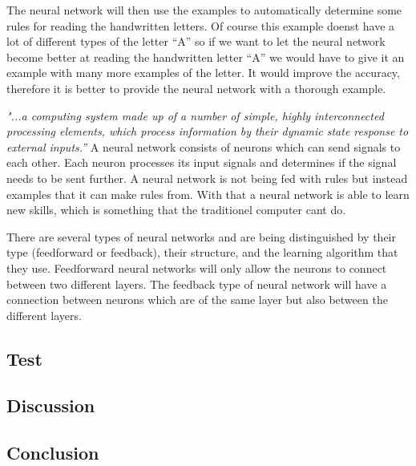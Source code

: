 The neural network will then use the examples to automatically determine some rules for reading the handwritten letters. Of course this example doenst have a lot of different types of the letter “A” so if we want to let the neural network become better at reading the handwritten letter “A” we would have to give it an example with many more examples of the letter. It would improve the accuracy, therefore it is better to provide the neural network with a thorough example.


\textit{"...a computing system made up of a number of simple, highly interconnected processing elements, which process information by their dynamic state response to external inputs.”}
A neural network consists of neurons which can send signals to each other. Each neuron processes its input signals and determines if the signal needs to be sent further. 
A neural network is not being fed with rules but instead examples that it can make rules from. With that a neural network is able to learn new skills, which is something that the traditionel computer cant do.

There are several types of neural networks and are being distinguished by their type (feedforward or feedback), their structure, and the learning algorithm that they use.
Feedforward neural networks will only allow the neurons to connect between two different layers. The feedback type of neural network will have a connection between neurons which are of the same layer but also between the different layers.

\subsection{Test}


\subsection{Discussion}

\subsection{Conclusion}